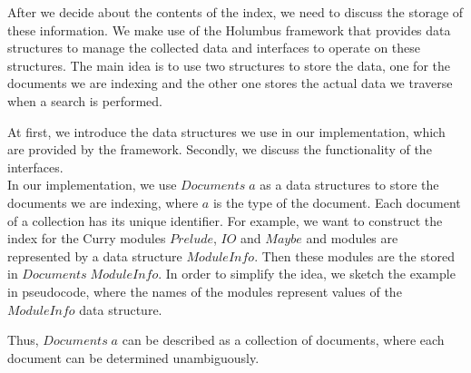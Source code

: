 \documentclass[%
	latex,%
	a4paper,%
	oneside,%
	chapterprefix,%
	headsepline,%
	12pt%
]{scrbook}
\newcommand{\Conid}[1]{\mathit{#1}}
\newcommand{\Varid}[1]{\mathit{#1}}
\def\resethooks{%
  \global\let\SaveRestoreHook\empty
  \global\let\ColumnHook\empty}
\let\hspre\empty
\let\hspost\empty
\begin{document}




After we decide about the contents of the index, we need to discuss
the storage of these information. %
We make use of the Holumbus framework that provides data structures to
manage the collected data and interfaces to operate on these
structures. %
The main idea is to use two structures to store the data, one for the
documents we are indexing and the other one stores the actual data we
traverse when a search is performed. %

At first, we introduce the data structures we use in our
implementation, which are provided by the framework. %
Secondly, we discuss the functionality of the interfaces. \\

In our implementation, we use \ensuremath{\Conid{Documents}\;\Varid{a}} as a data structures to
store the documents we are indexing, where \ensuremath{\Varid{a}} is the type of the
document. %
Each document of a collection has its unique identifier. %
For example, we want to construct the index for the Curry modules
\ensuremath{\Conid{Prelude}}, \ensuremath{\Conid{IO}} and \ensuremath{\Conid{Maybe}} and modules are represented
by a data structure \ensuremath{\Conid{ModuleInfo}}. %
Then these modules are the stored in \ensuremath{\Conid{Documents}\;\Conid{ModuleInfo}}. %
In order to simplify the idea, we sketch the example in pseudocode,
where the names of the modules represent values of the \ensuremath{\Conid{ModuleInfo}}
data structure. %

{\small
{}\resethooks
}
Thus, \ensuremath{\Conid{Documents}\;\Varid{a}} can be described as a collection of documents,
where each document can be determined unambiguously.
\end{document}

